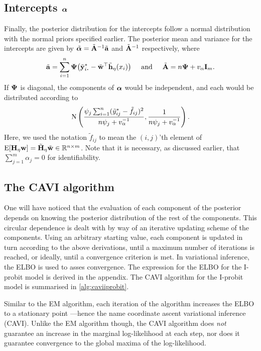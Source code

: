 \subsection{Intercepts \texorpdfstring{${\bm\alpha}$}{$\alpha$}}

Finally, the posterior distribution for the intercepts follow a normal distribution with the normal priors specified earlier.
The posterior mean and variance for the intercepts are given by $\tilde{{\bm\alpha}} = \tilde {{\mathbf A}}^{-1}\tilde {{\mathbf a}}$ and $\tilde {{\mathbf A}}^{-1}$ respectively, where
\[
  \tilde\ba = \sum_{i=1}^n \bPsi\big( \tilde\by^*_{i \bigcdot} -\tilde\bw^\top\tilde\bh_\eta(x_i)\big)
  \hspace{0.5cm}\text{and}\hspace{0.5cm}
  \tilde\bA = n\bPsi + v_\alpha \bI_m.
\]
If ${\bm\Psi}$ is diagonal, the components of ${\bm\alpha}$ would be independent, and each would be distributed according to
\[
  \operatorname{N}\left( 
  \frac{\psi_j\sum_{i=1}^n (\tilde y^*_{ij} -  \tilde f_{ij})^2}{n\psi_j + v_\alpha^{-1}},
  \frac{1}{n\psi_j + v_\alpha^{-1}} 
  \right).
\]
Here, we used the notation $\tilde f_{ij}$ to mean the $(i,j)$'th element of 
$\operatorname{E}[{\mathbf H}_\eta{\mathbf w}] = \tilde{{\mathbf H}}_\eta \tilde {{\mathbf w}} \in \mathbb{R}^{n\times m}$.
Note that it is necessary, as discussed earlier, that $\sum_{j=1}^m\alpha_j = 0$ for identifiability.

\subsection{The CAVI algorithm}

One will have noticed that the evaluation of each component of the posterior depends on knowing the posterior distribution of the rest of the components.
This circular dependence is dealt with by way of an iterative updating scheme of the components.
Using an arbitrary starting value, each component is updated in turn according to the above derivations, until a maximum number of iterations is reached, or ideally, until a convergence criterion is met.
In variational inference, the ELBO is used to asses convergence.
The expression for the ELBO for the I-probit model is derived in the appendix.
The CAVI algorithm for the I-probit model is summarised in \cref{alg:caviiprobit}.

Similar to the EM algorithm, each iteration of the algorithm increases the ELBO to a stationary point \citep{blei2017variational}---hence the name coordinate ascent variational inference (CAVI).
Unlike the EM algorithm though, the CAVI algorithm does \emph{not} guarantee an increase in the marginal log-likelihood at each step, nor does it guarantee convergence to the global maxima of the log-likelihood.

